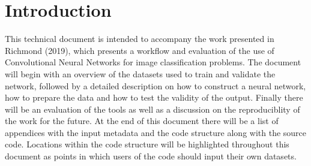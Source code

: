 \chapter{Introduction}
This technical document is intended to accompany the work presented in Richmond (2019), which presents a workflow and evaluation of the use of Convolutional Neural Networks for image classification problems. The document will begin with an overview of the datasets used to train and validate the network, followed by a detailed description on how to construct a neural network, how to prepare the data and how to test the validity of the output. Finally there will be an evaluation of the tools as well as a discussion on the reproduciblity of the work for the future.
\newline
At the end of this document there will be a list of appendices with the input metadata and the code structure along with the source code. Locations within the code structure will be highlighted throughout this document as points in which users of the code should input their own datasets. 

